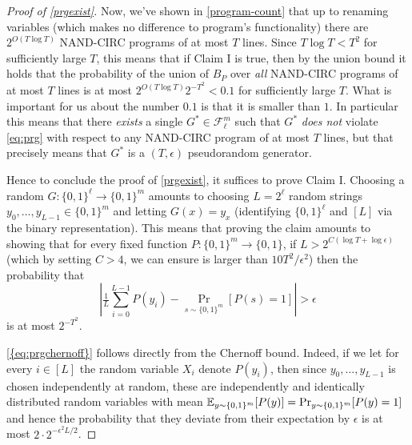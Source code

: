 \begin{proof}[Proof of \cref{prgexist}]
Now, we've shown in \cref{program-count} that up to renaming variables
(which makes no difference to program's functionality) there are
\(2^{O(T\log T)}\) NAND-CIRC programs of at most \(T\) lines. Since
\(T\log T < T^2\) for sufficiently large \(T\), this means that if Claim
I is true, then by the union bound it holds that the probability of the
union of \(B_P\) over \emph{all} NAND-CIRC programs of at most \(T\)
lines is at most \(2^{O(T\log T)}2^{-T^2} < 0.1\) for sufficiently large
\(T\). What is important for us about the number \(0.1\) is that it is
smaller than \(1\). In particular this means that there \emph{exists} a
single \(G^* \in \mathcal{F}_\ell^m\) such that \(G^*\) \emph{does not}
violate \eqref{eq:prg} with respect to any NAND-CIRC program of at most
\(T\) lines, but that precisely means that \(G^*\) is a \((T,\epsilon)\)
pseudorandom generator.

Hence to conclude the proof of \cref{prgexist}, it suffices to prove
Claim I. Choosing a random \(G: \{0,1\}^\ell \rightarrow \{0,1\}^m\)
amounts to choosing \(L=2^\ell\) random strings
\(y_0,\ldots,y_{L-1} \in \{0,1\}^m\) and letting \(G(x)=y_x\)
(identifying \(\{0,1\}^\ell\) and \([L]\) via the binary
representation). This means that proving the claim amounts to showing
that for every fixed function \(P:\{0,1\}^m \rightarrow \{0,1\}\), if
\(L > 2^{C (\log T + \log \epsilon)}\) (which by setting \(C>4\), we can
ensure is larger than \(10 T^2/\epsilon^2\)) then the probability that
\[
\left| \tfrac{1}{L}\sum_{i=0}^{L-1} P(y_i)  -  \Pr_{s \sim \{0,1\}^m}[P(s)=1] \right| > \epsilon \label{eq:prgchernoff}
\] is at most \(2^{-T^2}\).

\eqref{{eq:prgchernoff}} follows directly from the Chernoff bound.
Indeed, if we let for every \(i\in [L]\) the random variable \(X_i\)
denote \(P(y_i)\), then since \(y_0,\ldots,y_{L-1}\) is chosen
independently at random, these are independently and identically
distributed random variables with mean
\(\operatorname*{\mathbb E}_{y \sim \{0,1\}^m}[P(y)]= \Pr_{y\sim \{0,1\}^m}[ P(y)=1]\) and
hence the probability that they deviate from their expectation by
\(\epsilon\) is at most \(2\cdot 2^{-\epsilon^2 L/2}\).

\end{proof}



